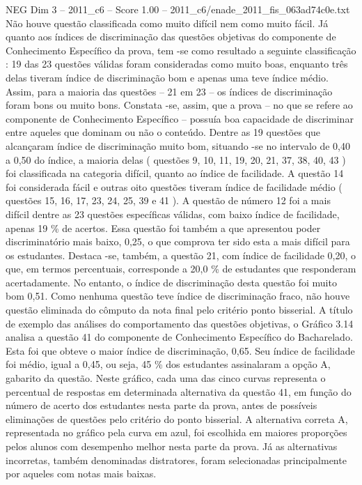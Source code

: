 \begin{textsample}{NEG Dim 3 – 2011\_c6 – Score 1.00 – 2011\_c6/enade\_2011\_fis\_063ad74c0e.txt}
Não houve questão classificada como muito difícil nem como muito fácil.
Já quanto aos índices de discriminação das questões objetivas do componente de Conhecimento Específico da prova, tem -se como resultado a seguinte classificação : 19 das 23 questões válidas foram consideradas como muito boas, enquanto três delas tiveram índice de discriminação bom e apenas uma teve índice médio.
Assim, para a maioria das questões – 21 em 23 – os índices de discriminação foram bons ou muito bons.
Constata -se, assim, que a prova – no que se refere ao componente de Conhecimento Específico – possuía boa capacidade de discriminar entre aqueles que dominam ou não o conteúdo.
Dentre as 19 questões que alcançaram índice de discriminação muito bom, situando -se no intervalo de 0,40 a 0,50 do índice, a maioria delas ( questões 9, 10, 11, 19, 20, 21, 37, 38, 40, 43 ) foi classificada na categoria difícil, quanto ao índice de facilidade.
A questão 14 foi considerada fácil e outras oito questões tiveram índice de facilidade médio ( questões 15, 16, 17, 23, 24, 25, 39 e 41 ).
A questão de número 12 foi a mais difícil dentre as 23 questões específicas válidas, com baixo índice de facilidade, apenas 19 \% de acertos.
Essa questão foi também a que apresentou poder discriminatório mais baixo, 0,25, o que comprova ter sido esta a mais difícil para os estudantes.
Destaca -se, também, a questão 21, com índice de facilidade 0,20, o que, em termos percentuais, corresponde a 20,0 \% de estudantes que responderam acertadamente.
No entanto, o índice de discriminação desta questão foi muito bom 0,51.
Como nenhuma questão teve índice de discriminação fraco, não houve questão eliminada do cômputo da nota final pelo critério ponto bisserial.
A título de exemplo das análises do comportamento das questões objetivas, o Gráfico 3.14 analisa a questão 41 do componente de Conhecimento Específico do Bacharelado.
Esta foi que obteve o maior índice de discriminação, 0,65.
Seu índice de facilidade foi médio, igual a 0,45, ou seja, 45 \% dos estudantes assinalaram a opção A, gabarito da questão.
Neste gráfico, cada uma das cinco curvas representa o percentual de respostas em determinada alternativa da questão 41, em função do número de acerto dos estudantes nesta parte da prova, antes de possíveis eliminações de questões pelo critério do ponto bisserial.
A alternativa correta A, representada no gráfico pela curva em azul, foi escolhida em maiores proporções pelos alunos com desempenho melhor nesta parte da prova.
Já as alternativas incorretas, também denominadas distratores, foram selecionadas principalmente por aqueles com notas mais baixas.

\end{textsample}
